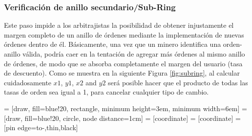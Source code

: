 \documentclass[UTF8,nofonts]{article}
\makeatletter
\newenvironment{figurehere}
 {\def\@captype{figure}}
 {}
\makeatother
\begin{document}
\begin{multicols}{2}
\subsubsection{Verificaci\'on de anillo secundario/Sub-Ring\label{sec:sub_ring_check}}
Este paso impide a los arbitrajistas la posibilidad de obtener injustamente el margen completo de un anillo de \'ordenes mediante la implementaci\'on de nuevas \'ordenes dentro de \'el. B\'asicamente, una vez que un minero identifica una orden-anillo v\'alida, podr\'ia caer en la tentaci\'on de agregar m\'as \'ordenes al mismo anillo de \'ordenes, de modo que se absorba completamente el margen del usuario (tasa de descuento). Como se muestra en la siguiente Figura \ref{fig:subring}, al calcular cuidadosamente $x1$, $y1$, $x2$ and $y2$ ser\'a posible hacer que el producto de todas las tasas de orden sea igual a 1, para cancelar cualquier tipo de cambio.

\begin{center}
\begin{figurehere}
\centering
{} = [draw, fill=blue!20, rectangle, 
    minimum height=3em, minimum width=6em]
 = [draw, fill=blue!20, circle, node distance=1cm]
 = [coordinate]
 = [coordinate]
 = [pin edge={to-,thin,black}]

\end{figurehere}
\end{center}
\end{multicols}
\end{document}
